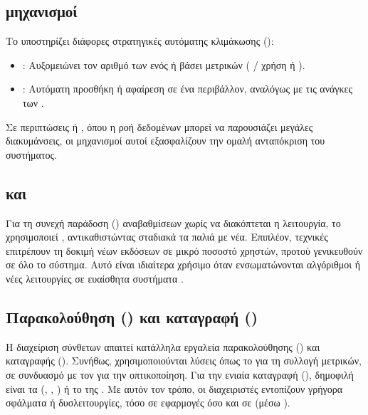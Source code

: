 \subsection{ μηχανισμοί}

Το  υποστηρίζει διάφορες στρατηγικές αυτόματης κλιμάκωσης ():
\begin{itemize}
    \item \textbf{}: Αυξομειώνει τον αριθμό των  ενός  ή  βάσει μετρικών ( /  χρήση ή ).
    \item \textbf{}: Αυτόματη προσθήκη ή αφαίρεση  σε ένα  περιβάλλον, αναλόγως με τις ανάγκες των .
\end{itemize}
Σε περιπτώσεις  ή , όπου η ροή δεδομένων μπορεί να παρουσιάζει μεγάλες διακυμάνσεις, οι μηχανισμοί αυτοί εξασφαλίζουν την ομαλή ανταπόκριση του συστήματος.

\subsection{ και }

Για τη συνεχή παράδοση () αναβαθμίσεων χωρίς να διακόπτεται η λειτουργία, το  χρησιμοποιεί , αντικαθιστώντας σταδιακά τα παλιά  με νέα. Επιπλέον, τεχνικές  επιτρέπουν τη δοκιμή νέων εκδόσεων σε μικρό ποσοστό χρηστών, προτού γενικευθούν σε όλο το σύστημα. Αυτό είναι ιδιαίτερα χρήσιμο όταν ενσωματώνονται αλγόριθμοι  ή νέες λειτουργίες σε ευαίσθητα συστήματα .

\subsection{Παρακολούθηση () και καταγραφή ()}

Η διαχείριση σύνθετων   απαιτεί κατάλληλα εργαλεία παρακολούθησης () και καταγραφής (). Συνήθως, χρησιμοποιούνται λύσεις όπως το  για τη συλλογή μετρικών, σε συνδυασμό με τον  για την οπτικοποίηση. Για την ενιαία καταγραφή (), δημοφιλή είναι τα  (, , ) ή το  της . Με αυτόν τον τρόπο, οι διαχειριστές εντοπίζουν γρήγορα σφάλματα ή δυσλειτουργίες, τόσο σε εφαρμογές  όσο και σε  (μέσω ).

